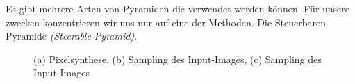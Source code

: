 \documentclass[12pt]{report}
\begin{document}
\noindent Es gibt mehrere Arten von Pyramiden die verwendet werden können.
Für unsere zwecken konzentrieren wir uns nur auf eine der Methoden.
Die Steuerbaren Pyramide \textit{(Steerable-Pyramid)}.

\begin{figure}[H]
    \centering
    \qquad
    \qquad
    \caption{(a) Pixelsynthese, (b) Sampling des Input-Images, (c) Sampling des Input-Images}%
\end{figure}

\end{document}
